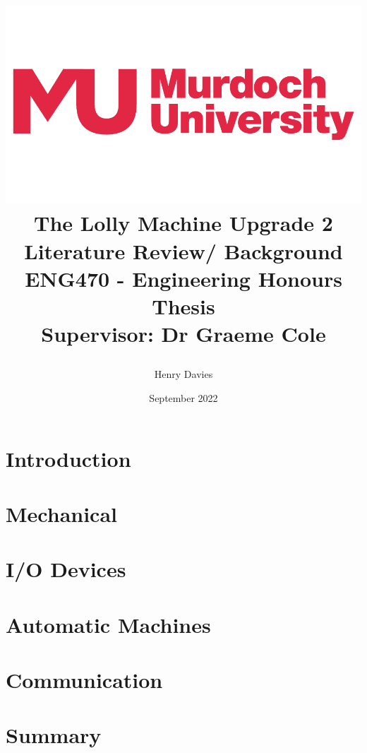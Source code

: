 \documentclass{article}
\title  {\begin{center}
            \includegraphics[scale = 0.2]{murdochLogo} 
            \vspace{10mm}
            \\{\Huge The Lolly Machine Upgrade 2}
            \vspace{10mm}
            \\{\Huge Literature Review/ Background}
            \vspace{5mm}
            \\{\Large ENG470 - Engineering Honours Thesis}
            \vspace{40mm} 
            \\ Supervisor: Dr Graeme Cole
        \end{center}}
\author{Henry Davies}
\date{September 2022}
\begin{document}
\maketitle
\newpage

\tableofcontents
\newpage

\listoffigures
\newpage

\printglossary[type=\acronymtype]
\newpage

\section{Introduction}
    
    \newpage

\section{Mechanical}
    
    \newpage

\section{I/O Devices}
    
    \newpage
    
\section{Automatic Machines}
    
    \newpage  
    
\section{Communication}
    
    \newpage
    
\section{Summary}
    
    \newpage
    
\printbibliography
\end{document}
